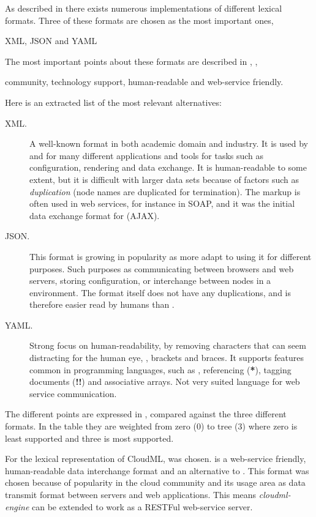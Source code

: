 As described in  there exists numerous implementations of different lexical formats.
Three of these formats are chosen as the most important ones,
\begin{ii}
  \iitem XML,
  \iitem JSON and
  \iitem YAML
\end{ii}
The most important points about these formats are described in ,
\ie,
\begin{ii}
  \iitem community,
  \iitem technology support,
  \iitem human-readable and
  \iitem web-service friendly.
\end{ii}
Here is an extracted list of the most relevant alternatives:
\begin{description}
  \item[XML.] A well-known format in both academic domain and industry.
    It is used by and for many different applications and tools for tasks such as configuration,
    rendering and data exchange.
    It is human-readable to some extent, but it is difficult with larger data sets because
    of factors such as \emph{duplication} (node names are duplicated for termination). 
    The markup is often used in web services, for instance in SOAP, 
    and it was the initial data exchange format for  (AJAX).
  \item[JSON.] This format is growing in popularity as more adapt to using it for
    different purposes.
    Such purposes as communicating between browsers and web servers, storing configuration,
    or interchange between nodes in a  environment.
    The format itself does not have any duplications, and is therefore easier read by humans
    than .
  \item[YAML.] Strong focus on human-readability, by removing characters that can seem
    distracting for the human eye, \eg, brackets and braces.
    It supports features common in programming languages, such as
    \eg, referencing (\textbf{*}), tagging documents (\textbf{!!}) and associative arrays.
    Not very suited language for web service communication.
\end{description}
The different points are expressed in , 
compared against the three different formats.
In the table they are weighted from zero ($0$) to tree ($3$) where zero is
least supported and three is most supported.

For the lexical representation of CloudML,  was chosen.
 is a web-service friendly, human-readable data interchange format and an alternative to .
This format was chosen because of popularity in the cloud community 
and its usage area as data transmit format between servers and web applications.
This means \emph{cloudml-engine} can be extended to work as a RESTFul web-service server.

